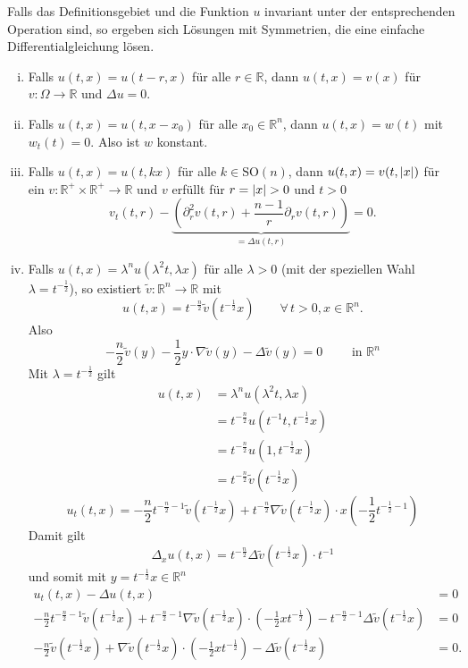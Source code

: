
Falls das Definitionsgebiet und die Funktion $u$ invariant unter der entsprechenden Operation sind, so ergeben sich Lösungen mit Symmetrien, die eine einfache
Differentialgleichung lösen.

\begin{enumerate}[(i)]
	\item Falls $u(t,x)=u(t-r,x)$ für alle $r \in \mathbb{R}$, dann $u(t,x)=v(x)$ für $v : \Omega \to \mathbb{R}$ und $ \Delta u = 0$.
	\item Falls $u(t,x)= u(t,x-x_0)$ für alle $x_0 \in \mathbb{R}^n$, dann $u(t,x)= w(t)$ mit $w_t(t)=0$. Also ist $w$ konstant.
	\item Falls $u(t,x)=u(t,kx)$ für alle $k \in \text{SO}(n)$, 
	dann $u(t,x)=v(t,\lvert x\rvert)$ für ein $v : \mathbb{R}^+ \times \mathbb{R}^+ \to \mathbb{R}$ und $v$ erfüllt für $r= \lvert x\rvert >0$ und $t >0$
	\[
		v_t(t,r) - \underset{=\Delta u(t,r)}{\underbrace{\left( \partial^2_r v(t,r)+ \frac{n-1}{r} \partial_r v(t,r) \right)}}=0.
	\]

	\item Falls $u(t,x)= \lambda^n u(\lambda^2 t, \lambda x)$ für alle $\lambda > 0$ (mit der speziellen Wahl $\lambda = t^{- \frac{1}{2}}$), so existiert $\tilde v : \mathbb{R}^n \to \mathbb{R}$ mit
	\[
		u(t,x) = t^{- \frac{n}{2}} \tilde v ( t^{- \frac{1}{2}}x) \qquad \forall\, t>0, x \in \mathbb{R}^n.
	\]
	Also
	\[
		- \frac{n}{2} \tilde v(y) - \frac{1}{2} y \cdot  \nabla \tilde v(y)- \Delta \tilde v(y) = 0 \qquad \text{ in } \mathbb{R}^n
	\]
	Mit $\lambda = t^{- \frac{1}{2}}$ gilt
	\begin{align*}
		u(t,x) &= \lambda^n u(\lambda^2 t, \lambda x) \\
		&= t^{- \frac{n}{2}} u(t^{-1}t, t^{- \frac{1}{2}} x) \\
		&= t^{- \frac{n}{2}} u(1, t^{- \frac{1}{2}} x) \\
		&= t^{- \frac{n}{2}} \tilde v(t^{- \frac{1}{2}} x)
	\end{align*}
	\[
		u_t(t,x) = - \frac{n}{2} t^{- \frac{n}{2} - 1} \tilde v(t^{- \frac{1}{2}} x) + t^{- \frac{n}{2}}  \nabla \tilde v(t^{- \frac{1}{2}} x) \cdot x 
		\left( - \frac{1}{2} t^{- \frac{1}{2}-1} \right)
	\]
	Damit gilt
	\[
		\Delta_x u(t,x) = t^{- \frac{n}{2}} \Delta \tilde v(t^{- \frac{1}{2}} x) \cdot t^{-1}
	\]
	und somit mit $y = t^{- \frac{1}{2}} x \in \mathbb{R}^n$
	\begin{align*}
		u_t(t,x) - \Delta u(t,x) &= 0 \\
		-\frac{n}{2} t^{- \frac{n}{2}-1} \tilde v(t^{- \frac{1}{2}} x) + t^{- \frac{n}{2}-1}  
		\nabla  \tilde v(t^{- \frac{1}{2}} x) \cdot (-\frac{1}{2} x t^{- \frac{1}{2}}) - t^{- \frac{n}{2}-1}  \Delta \tilde v(t^{- \frac{1}{2}}x) &= 0 \\
		-\frac{n}{2} \tilde v(t^{- \frac{1}{2}}x)+  \nabla \tilde v(t^{- \frac{1}{2}} x) \cdot \left( - \frac{1}{2} x t^{- \frac{1}{2}} \right)- \Delta \tilde v(t^{- \frac{1}{2}}x) &=0 .
	\end{align*}
	

\end{enumerate}
